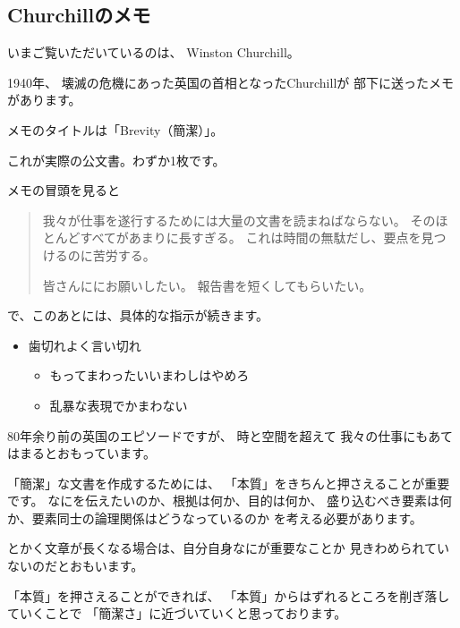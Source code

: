 \documentclass[uplatex,jis2004,dvipdfmx,12pt]{jsarticle}
\begin{document}
\subsection{Churchillのメモ}

いまご覧いただいているのは、
Winston Churchill。

1940年、
壊滅の危機にあった英国の首相となったChurchillが
部下に送ったメモがあります。

メモのタイトルは「Brevity（簡潔）」。

これが実際の公文書。わずか1枚です。

メモの冒頭を見ると

\begin{quote}
我々が仕事を遂行するためには大量の文書を読まねばならない。
そのほとんどすべてがあまりに長すぎる。
これは時間の無駄だし、要点を見つけるのに苦労する。

皆さんににお願いしたい。
報告書を短くしてもらいたい。
\end{quote}

で、このあとには、具体的な指示が続きます。
\begin{itemize}
 \item 歯切れよく言い切れ
       \begin{itemize}
       \item もってまわったいいまわしはやめろ
       \item 乱暴な表現でかまわない
       \end{itemize}

\end{itemize}




80年余り前の英国のエピソードですが、
時と空間を超えて
我々の仕事にもあてはまるとおもっています。


「簡潔」な文書を作成するためには、
「本質」をきちんと押さえることが重要です。
なにを伝えたいのか、根拠は何か、目的は何か、
盛り込むべき要素は何か、要素同士の論理関係はどうなっているのか
を考える必要があります。

とかく文章が長くなる場合は、自分自身なにが重要なことか
見きわめられていないのだとおもいます。

「本質」を押さえることができれば、
「本質」からはずれるところを削ぎ落していくことで
「簡潔さ」に近づいていくと思っております。
\end{document}
